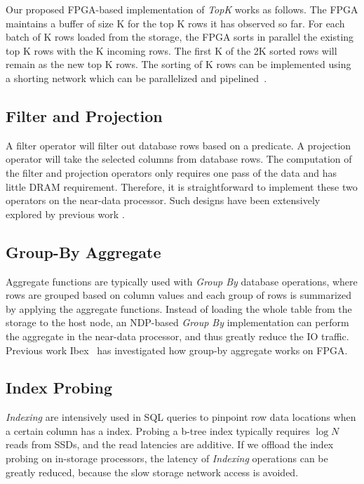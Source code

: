 \documentclass{article}
\newcommand{\indexing}{\textit{Indexing}\xspace}
\newcommand{\groupby}{\textit{Group By}\xspace}
\newcommand{\topk}{\textit{TopK}\xspace}
\begin{document}
Our proposed FPGA-based implementation of \topk works as follows. 
The FPGA maintains a buffer of size K for the top K rows it has observed so far. 
For each batch of K rows loaded from the storage, the FPGA sorts in parallel the existing top K rows with the K incoming rows. 
The first K of the 2K sorted rows will remain as the new top K rows. 
The sorting of K rows can be implemented using a shorting network which can be parallelized and pipelined~\cite{fpga-sort}.

\subsection{Filter and Projection}

A filter operator will filter out database rows based on a predicate.
A projection operator will take the selected columns from database rows.
The computation of the filter and projection operators only requires one pass of the data and has little DRAM requirement.
Therefore, it is straightforward to implement these two operators on the near-data processor. 
Such designs have been extensively explored by previous work \cite{netezza,exadata,biscuit,sukhwani2012database,do2013query}.

\subsection{Group-By Aggregate}

Aggregate functions are typically used with \groupby database operations, where rows are grouped based on column values and each group of rows is summarized by applying the aggregate functions.
Instead of loading the whole table from the storage to the host node, an NDP-based \groupby implementation can perform the aggregate in the near-data processor, and thus greatly reduce the IO traffic. 
Previous work Ibex~\cite{ibex} has investigated how group-by aggregate works on FPGA.

\subsection{Index Probing}
\label{sec:index}

\indexing are intensively used in SQL queries to pinpoint row data locations when a certain column has a index.
Probing a b-tree index typically requires $\log{N}$ reads from SSDs, and the read latencies are additive.
If we offload  the index probing on in-storage processors, the latency of \indexing operations can be greatly reduced, because the slow storage network access is avoided.
\end{document}
